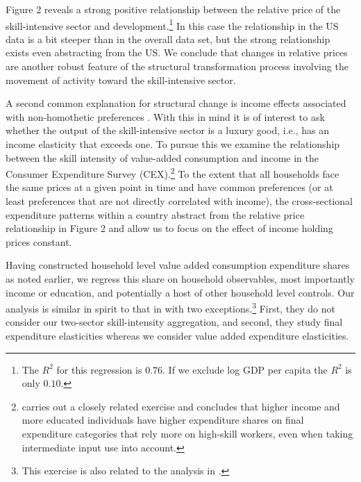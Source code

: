 \documentclass[12pt,english]{article}
\begin{document}
Figure 2 reveals a strong positive relationship between the relative price
of the skill-intensive sector and development.\footnote{%
The $R^{2}$ for this regression is $0.76$. If we exclude log GDP per capita
the $R^{2}$ is only $0.10$.} In this case the relationship in the US data is
a bit steeper than in the overall data set, but the strong relationship
exists even abstracting from the US. We conclude that changes in relative
prices are another robust feature of the structural transformation process
involving the movement of activity toward the skill-intensive sector.

A second common explanation for structural change is income effects
associated with non-homothetic preferences \citep[see, for example,][]{KRX01}%
. With this in mind it is of interest to ask whether the output of the
skill-intensive sector is a luxury good, i.e., has an income elasticity that
exceeds one. To pursue this we examine the relationship between the skill
intensity of value-added consumption and income in the Consumer Expenditure
Survey (CEX).\footnote{\citet{Leo15} carries out a closely related exercise
and concludes that higher income and more educated individuals have higher
expenditure shares on final expenditure categories that rely more on
high-skill workers, even when taking intermediate input use into account.}
To the extent that all households face the same prices at a given point in
time and have common preferences (or at least preferences that are not
directly correlated with income), the cross-sectional expenditure patterns
within a country abstract from the relative price relationship in Figure 2
and allow us to focus on the effect of income holding prices constant.

Having constructed household level value added consumption expenditure
shares as noted earlier, we regress this share on household observables,
most importantly income or education, and potentially a host of other
household level controls. Our analysis is similar in spirit to that in %
\citet{AguBil15} with two exceptions.\footnote{%
This exercise is also related to the analysis in \citet{Leo15}.} First, they
do not consider our two-sector skill-intensity aggregation, and second, they
study final expenditure elasticities whereas we consider value added
expenditure elasticities.
\end{document}
